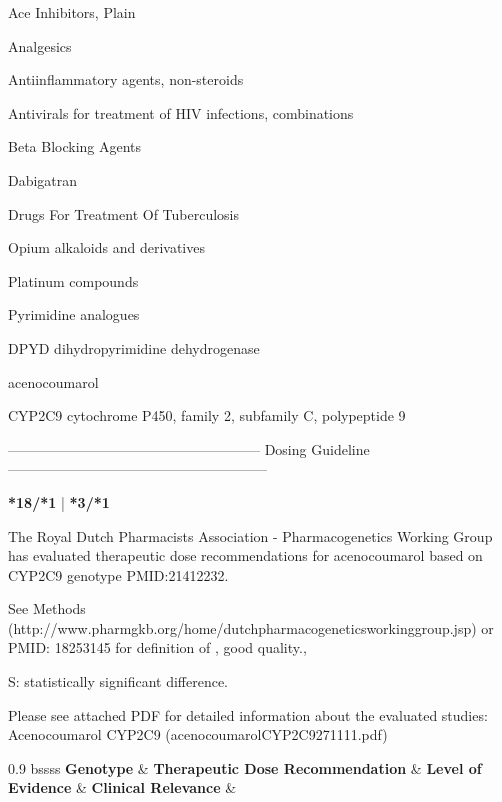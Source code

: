 \documentclass{resume} %
\begin{document}
\begin{rSection}{ Ace Inhibitors, Plain }
\begin{rSection}{ Analgesics }
\begin{rSection}{ Antiinflammatory agents, non-steroids }
\begin{rSection}{ Antivirals for treatment of HIV infections, combinations }
\begin{rSection}{ Beta Blocking Agents }
\begin{rSection}{ Dabigatran }
\begin{rSection}{ Drugs For Treatment Of Tuberculosis }
\begin{rSection}{ Opium alkaloids and derivatives }
\begin{rSection}{ Platinum compounds }
\begin{rSection}{ Pyrimidine analogues }
\begin{rSubsection}{ DPYD }{ dihydropyrimidine dehydrogenase }{}{}
\end{rSubsection}
\end{rSection}\begin{rSection}{ acenocoumarol }
\item[]
\begin{rSubsection}{ CYP2C9 }{ cytochrome P450, family 2, subfamily C, polypeptide 9 }{}{}
\item[]
\item[] ------------------------------------------------------ Dosing Guideline --------------------------------------------------------\newline
\item[]
\item[] \textbf{ *18/*1 } | \textbf{ *3/*1 }
\item The Royal Dutch Pharmacists Association - Pharmacogenetics Working Group has evaluated therapeutic dose recommendations for acenocoumarol based on CYP2C9 genotype PMID:21412232.
 \newline
\item *See Methods (http://www.pharmgkb.org/home/dutchpharmacogeneticsworkinggroup.jsp) or PMID: 18253145 for definition of , good quality., 
 \newline
\item S: statistically significant difference.
 \newline
\item Please see attached PDF for detailed information about the evaluated studies: Acenocoumarol CYP2C9 (acenocoumarolCYP2C9271111.pdf) \newline
\vspace{1pt}\newline
		\scriptsize
		\begin{center}
		\begin{tabularx}{0.9\textwidth}{ bssss }
		\textbf{ Genotype }&\textbf{ Therapeutic Dose Recommendation }&\textbf{ Level of Evidence }&\textbf{ Clinical Relevance }&\textbf{
}\\
		\vspace{1pt}\\
		\hline \\
		\vspace{1pt}\\

\end{tabularx}
\end{center}
\end{rSubsection}
\end{rSection}
\end{rSection}
\end{rSection}
\end{rSection}
\end{rSection}
\end{rSection}
\end{rSection}
\end{rSection}
\end{rSection}
\end{rSection}
\end{document}
